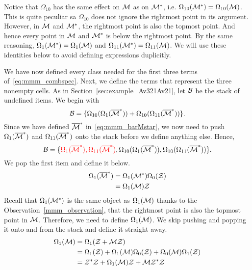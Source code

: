 \documentclass[12pt, a4paper, twoside]{report}
\begin{document}
\begin{observation}
\label{mmm_observation}
Notice that $\Omega_{10}$ has the same effect on $\mathcal{M}$ as on $\mathcal{M}^*$, i.e. $\Omega_{10}(\mathcal{M}^*) = \Omega_{10}(\mathcal{M})$. This is quite peculiar sa $\Omega_{10}$ does not ignore the rightmost point in its argument. However, in $\mathcal{M}$ and $\mathcal{M}^*$, the rightmost point is also the topmost point. And hence every point in $\mathcal{M}$ and $\mathcal{M}^*$ is below the rightmost point. By the same reasoning, $\Omega_1(\mathcal{M}^*) = \Omega_1(\mathcal{M})$ and $\Omega_{11}(\mathcal{M}^*) = \Omega_{11}(\mathcal{M})$. We will use these identities below to avoid defining expressions duplicitly.
\end{observation}
We have now defined every class needed for the first three terms of~\eqref{eq:mmm_combspec}. Next, we define the terms that represent the three nonempty cells. As in Section~\ref{sec:example_Av321Av21}, let $\mathcal{B}$ be the stack of undefined items. We begin with
$$\mathcal{B} = \{\Omega_{10}(\Omega_1(\overline{\mathcal{M}}^*)) + \Omega_{10}(\Omega_{11}(\overline{\mathcal{M}}^*))\}.$$
Since we have defined $\overline{\mathcal{M}}^*$ in~\eqref{eq:mmm_barMstar}, we now need to push $\Omega_1(\overline{\mathcal{M}}^*)$ and $\Omega_{11}(\overline{\mathcal{M}}^*)$ onto the stack before we define anything else. Hence,
$$\mathcal{B} = \{\textcolor{red}{\Omega_1(\overline{\mathcal{M}}^*), \Omega_{11}(\overline{\mathcal{M}}^*)}, \Omega_{10}(\Omega_1(\overline{\mathcal{M}}^*)), \Omega_{10}(\Omega_{11}(\overline{\mathcal{M}}^*))\}.$$
We pop the first item and define it below.
\begin{align}
  \begin{aligned}
  \Omega_1(\overline{\mathcal{M}}^*) &= \Omega_1(\mathcal{M}^*)\Omega_0(\mathcal{Z})\\
                      &=  \Omega_1(\mathcal{M})\mathcal{Z}
                    \end{aligned}
\end{align}
Recall that $\Omega_1(\mathcal{M}^*)$ is the same object as $\Omega_1(\mathcal{M})$ thanks to the Observation~\ref{mmm_observation}, that the rightmost point is also the topmost point in $\mathcal{M}$. Therefore, we need to define $\Omega_1(\mathcal{M})$. We skip pushing and popping it onto and from the stack and define it straight away.
\begin{align}
  \begin{aligned}
    \Omega_1(\mathcal{M}) &= \Omega_1(\mathcal{Z} + \mathcal{M}\mathcal{Z})\\
    &= \Omega_1(\mathcal{Z}) + \Omega_1(\mathcal{M})\Omega_0(\mathcal{Z}) + \Omega_0(\mathcal{M})\Omega_1(\mathcal{Z})\\
    &= \mathcal{Z}^*\mathcal{Z} + \Omega_1(\mathcal{M})\mathcal{Z} + \mathcal{M}\mathcal{Z}^*\mathcal{Z}
  \end{aligned}
\end{align}
\end{document}
